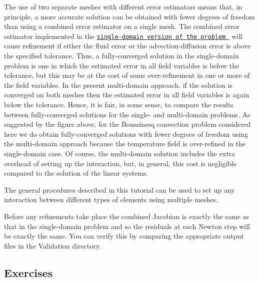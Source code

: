 \begin{DoxyItemize}
\item The use of two separate meshes with different error estimators means that, in principle, a more accurate solution can be obtained with fewer degrees of freedom than using a combined error estimator on a single mesh. The combined error estimator implemented in the \href{../../refine_b_convect/html/index.html}{\tt single-\/domain version of the problem } will cause refinement if either the fluid error or the advection-\/diffusion error is above the specified tolerance. Thus, a fully-\/converged solution in the single-\/domain problem is one in which the estimated error in all field variables is below the tolerance, but this may be at the cost of some over-\/refinement in one or more of the field variables. In the present multi-\/domain approach, if the solution is converged on both meshes then the estimated error in all field variables is again below the tolerance. Hence, it is fair, in some sense, to compare the results between fully-\/converged solutions for the single-\/ and multi-\/domain problems. As suggested by the figure above, for the Boussinesq convection problem considered here we do obtain fully-\/converged solutions with fewer degrees of freedom using the multi-\/domain approach because the temperature field is over-\/refined in the single-\/domain case. Of course, the multi-\/domain solution includes the extra overhead of setting up the interaction, but, in general, this cost is negligible compared to the solution of the linear systems. ~\newline
~\newline

\item The general procedures described in this tutorial can be used to set up any interaction between different types of elements using multiple meshes. ~\newline
~\newline

\item Before any refinements take place the combined Jacobian is exactly the same as that in the single-\/domain problem and so the residuals at each Newton step will be exactly the same. You can verify this by comparing the appropriate output files in the {\ttfamily Validation} directory.
\end{DoxyItemize}

\hypertarget{index_exercises}{}\subsection{Exercises}\label{index_exercises}

